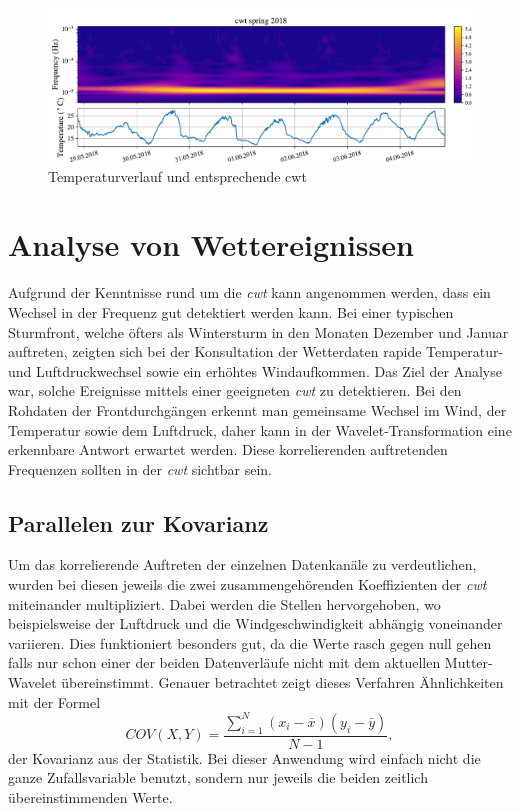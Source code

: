 \begin{refsection}
\begin{figure}[h]
	\centering
	\includegraphics[width=1\textwidth]{papers/wwt/images/data_spring.pdf}
	\caption{Temperaturverlauf und entsprechende cwt}
	\label{fig:cwt_zoom}
\end{figure}



\section{Analyse von Wettereignissen}
Aufgrund der Kenntnisse rund um die \textit{cwt} kann angenommen werden, dass ein Wechsel in der Frequenz gut detektiert werden kann.
Bei einer typischen Sturmfront, welche öfters als Wintersturm in den Monaten Dezember und Januar auftreten, zeigten sich bei der Konsultation der Wetterdaten rapide Temperatur- und Luftdruckwechsel sowie ein erhöhtes Windaufkommen.
Das Ziel der Analyse war, solche Ereignisse mittels einer geeigneten \textit{cwt} zu detektieren.
Bei den Rohdaten der Frontdurchgängen erkennt man gemeinsame Wechsel im Wind, der Temperatur sowie dem Luftdruck, daher kann in der Wavelet-Transformation eine erkennbare Antwort erwartet werden. 
Diese korrelierenden auftretenden Frequenzen sollten in der \textit{cwt} sichtbar sein.

\subsection{Parallelen zur Kovarianz}

Um das korrelierende Auftreten der einzelnen Datenkanäle zu verdeutlichen, wurden bei diesen jeweils die zwei zusammengehörenden Koeffizienten der \textit{cwt} miteinander multipliziert. 
Dabei werden die Stellen hervorgehoben, wo beispielsweise der Luftdruck und die Windgeschwindigkeit abhängig voneinander variieren.  
Dies funktioniert besonders gut, da die Werte rasch gegen null gehen falls nur schon einer der beiden Datenverläufe nicht mit dem aktuellen Mutter-Wavelet übereinstimmt.
Genauer betrachtet zeigt dieses Verfahren Ähnlichkeiten mit der Formel
\begin{equation}
COV(X,Y) = \frac{\sum_{i=1}^{N} (x_i- \bar{x})(y_i- \bar{y})}{N-1},
\label{eq:kovarianz}
\end{equation}
der Kovarianz aus der Statistik. Bei dieser Anwendung wird einfach nicht die ganze Zufallsvariable benutzt, sondern nur jeweils die beiden zeitlich übereinstimmenden Werte.


\end{refsection}
